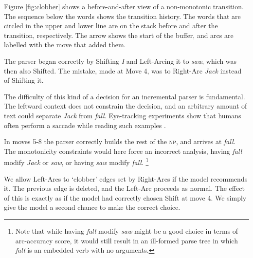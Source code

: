 \documentclass[11pt,letterpaper]{article}
\begin{document}
Figure \ref{fig:clobber} shows a before-and-after view of a non-monotonic
transition. The sequence below the words shows the transition history.
The words that are circled in the upper and lower line are on the stack before
and after the transition, respectively. The arrow shows the start of the buffer,
and arcs are labelled with the move that added them. 

The parser began correctly by Shifting \emph{I}
and Left-Arcing it to \emph{saw}, which was then also Shifted. The mistake, made
at Move 4, was to Right-Arc \emph{Jack} instead of Shifting it.

The difficulty of this kind of a decision for an incremental parser is fundamental.
The leftward context does not constrain the decision, 
and an arbitrary amount of text could separate \emph{Jack} from
\emph{fall}. Eye-tracking
experiments show that humans often perform a saccade while reading such
examples \citep{FrazierRayner1982}.

In moves 5-8 the parser correctly builds the rest of the \textsc{np}, and arrives
at \emph{fall}. The monotonicity constraints would here force an incorrect
analysis,
having \emph{fall} modify \emph{Jack} or \emph{saw}, or having 
\emph{saw} modify \emph{fall}.
\footnote{Note that while having
\emph{fall} modify \emph{saw} might be a good choice in terms
of arc-accuracy score, it would still result in an ill-formed parse tree in which
\emph{fall} is an embedded verb with no arguments.}


We allow Left-Arcs to `clobber' edges set by Right-Arcs if the model
recommends it. The previous edge is deleted, and the Left-Arc proceeds as normal. The
effect of this is exactly as if the model had correctly chosen Shift at
move 4. We simply give the model a second chance to make the correct choice.
\end{document}
